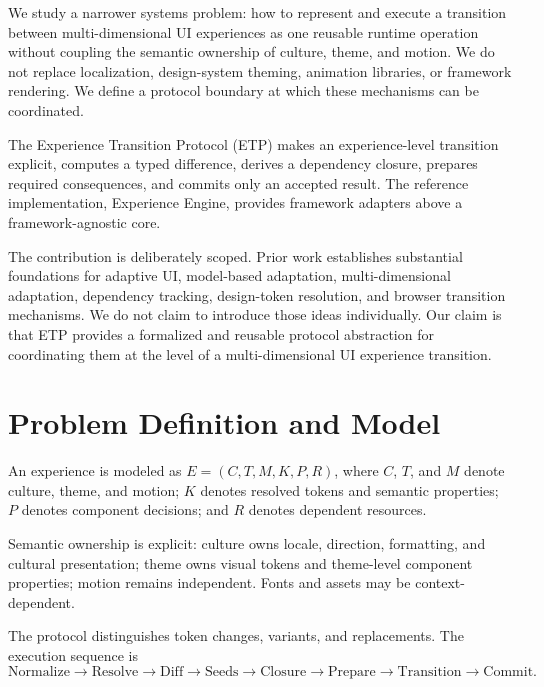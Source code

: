 \documentclass[manuscript]{acmart}
\begin{document}
We study a narrower systems problem: how to represent and execute a transition between
multi-dimensional UI experiences as one reusable runtime operation without coupling the
semantic ownership of culture, theme, and motion. We do not replace localization,
design-system theming, animation libraries, or framework rendering. We define a protocol
boundary at which these mechanisms can be coordinated.

The Experience Transition Protocol (ETP) makes an experience-level transition explicit,
computes a typed difference, derives a dependency closure, prepares required consequences,
and commits only an accepted result. The reference implementation, Experience Engine,
provides framework adapters above a framework-agnostic core.

The contribution is deliberately scoped. Prior work establishes substantial foundations for
adaptive UI, model-based adaptation, multi-dimensional adaptation, dependency tracking,
design-token resolution, and browser transition mechanisms. We do not claim to introduce
those ideas individually. Our claim is that ETP provides a formalized and reusable protocol
abstraction for coordinating them at the level of a multi-dimensional UI experience
transition.

\section{Problem Definition and Model}
An experience is modeled as $E=(C,T,M,K,P,R)$, where $C$, $T$, and $M$ denote culture,
theme, and motion; $K$ denotes resolved tokens and semantic properties; $P$ denotes
component decisions; and $R$ denotes dependent resources.

Semantic ownership is explicit: culture owns locale, direction, formatting, and cultural
presentation; theme owns visual tokens and theme-level component properties; motion remains
independent. Fonts and assets may be context-dependent.

The protocol distinguishes token changes, variants, and replacements. The execution sequence is
\[
\mathrm{Normalize}\rightarrow\mathrm{Resolve}\rightarrow\mathrm{Diff}\rightarrow
\mathrm{Seeds}\rightarrow\mathrm{Closure}\rightarrow\mathrm{Prepare}\rightarrow
\mathrm{Transition}\rightarrow\mathrm{Commit}.
\]
\end{document}
